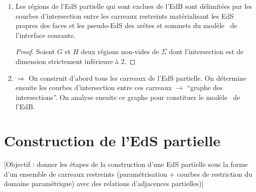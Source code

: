 \begin{enumerate}
	\item Les régions de l'EdS partielle qui sont exclues de l'EdB sont délimitées par les courbes d'intersection entre les carreaux restreints matérialisant les EdS propres des faces et les pseudo-EdS des arêtes et sommets du modèle \brep\ de l'interface courante. 
	\begin{proof}
		Soient $G$ et $H$ deux régions non-vides de $\Sigma$ dont l'intersection est de dimension strictement inférieure à 2.
	\end{proof}
	
	
	\item $\Rightarrow$ On construit d'abord tous les carreaux de l'EdS partielle. On détermine ensuite les courbes d'intersection entre ces carreaux $\to$ ``graphe des intersections''. On analyse ensuite ce graphe pour constituer le modèle \brep\ de l'EdB.
\end{enumerate}








\section{Construction de l'EdS partielle}
\label{section:construction_EdS_partielle}

[Objectif : donner les étapes de la construction d'une EdS partielle sous la forme d'un ensemble de carreaux restreints (paramétrisation + courbes de restriction du domaine paramétrique) avec des relations d'adjacences partielles)]


